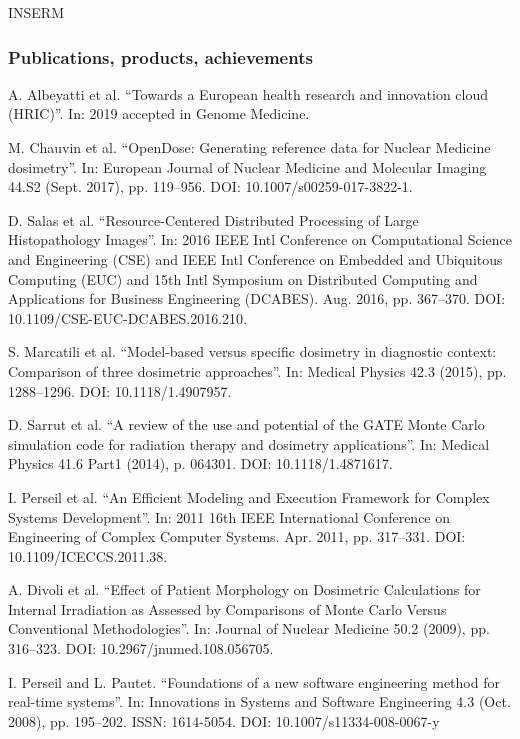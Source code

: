 \begin{sitedescription}{INSERM}

\subsubsection*{Publications, products, achievements}
\begin{compactenum}
\item A. Albeyatti et al. “Towards a European health research and innovation
  cloud (HRIC)”. In: 2019 accepted in Genome Medicine.
\item M. Chauvin et al. “OpenDose: Generating reference data for Nuclear
  Medicine dosimetry”. In: European Journal of Nuclear Medicine and Molecular
  Imaging 44.S2 (Sept. 2017), pp. 119--956. DOI: 10.1007/s00259-017-3822-1.
\item D. Salas et al. “Resource-Centered Distributed Processing of Large
  Histopathology Images”. In: 2016 IEEE Intl Conference on Computational
  Science and Engineering (CSE) and IEEE Intl Conference on Embedded and
  Ubiquitous Computing (EUC) and 15th Intl Symposium on Distributed Computing
  and Applications for Business Engineering (DCABES). Aug. 2016, pp. 367--370.
  DOI: 10.1109/CSE-EUC-DCABES.2016.210.
\item S. Marcatili et al. “Model-based versus specific dosimetry in diagnostic
  context: Comparison of three dosimetric approaches”. In: Medical Physics 42.3
  (2015), pp. 1288--1296. DOI: 10.1118/1.4907957.
\item D. Sarrut et al. “A review of the use and potential of the GATE Monte
  Carlo simulation code for radiation therapy and dosimetry applications”. In:
  Medical Physics 41.6 Part1 (2014), p. 064301. DOI: 10.1118/1.4871617.
\item I. Perseil et al. “An Efficient Modeling and Execution Framework for
  Complex Systems Development”. In: 2011 16th IEEE International Conference on
  Engineering of Complex Computer Systems. Apr. 2011, pp. 317--331. DOI:
  10.1109/ICECCS.2011.38.
\item  A. Divoli et al. “Effect of Patient Morphology on Dosimetric
  Calculations for Internal Irradiation as Assessed by Comparisons of Monte
  Carlo Versus Conventional Methodologies”. In: Journal of Nuclear Medicine
  50.2 (2009), pp. 316--323. DOI: 10.2967/jnumed.108.056705.
\item I. Perseil and L. Pautet. “Foundations of a new software engineering
  method for real-time systems”. In: Innovations in Systems and Software
  Engineering 4.3 (Oct. 2008), pp. 195--202. ISSN: 1614-5054. DOI:
  10.1007/s11334-008-0067-y
\end{compactenum}


\end{sitedescription}
